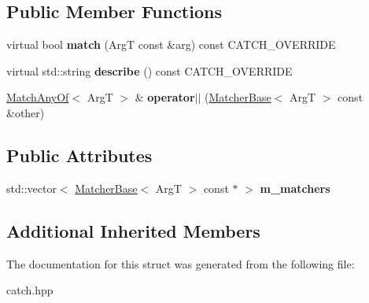\subsection*{Public Member Functions}
\begin{DoxyCompactItemize}
\item 
\mbox{\label{structCatch_1_1Matchers_1_1Impl_1_1MatchAnyOf_a73be317ecf5919af855af96d68e714b9}} 
virtual bool {\bfseries match} (ArgT const \&arg) const C\+A\+T\+C\+H\+\_\+\+O\+V\+E\+R\+R\+I\+DE
\item 
\mbox{\label{structCatch_1_1Matchers_1_1Impl_1_1MatchAnyOf_a020f5d7889d8cd8be9ad309c690147b6}} 
virtual std\+::string {\bfseries describe} () const C\+A\+T\+C\+H\+\_\+\+O\+V\+E\+R\+R\+I\+DE
\item 
\mbox{\label{structCatch_1_1Matchers_1_1Impl_1_1MatchAnyOf_a44d7582dbe09fc31b9a5ba8a6367b506}} 
\hyperlink{structCatch_1_1Matchers_1_1Impl_1_1MatchAnyOf}{Match\+Any\+Of}$<$ ArgT $>$ \& {\bfseries operator$\vert$$\vert$} (\hyperlink{structCatch_1_1Matchers_1_1Impl_1_1MatcherBase}{Matcher\+Base}$<$ ArgT $>$ const \&other)
\end{DoxyCompactItemize}
\subsection*{Public Attributes}
\begin{DoxyCompactItemize}
\item 
\mbox{\label{structCatch_1_1Matchers_1_1Impl_1_1MatchAnyOf_a1fb1119e6110dc15b8d5262ec0aeddd5}} 
std\+::vector$<$ \hyperlink{structCatch_1_1Matchers_1_1Impl_1_1MatcherBase}{Matcher\+Base}$<$ ArgT $>$ const  $\ast$ $>$ {\bfseries m\+\_\+matchers}
\end{DoxyCompactItemize}
\subsection*{Additional Inherited Members}


The documentation for this struct was generated from the following file\+:\begin{DoxyCompactItemize}
\item 
catch.\+hpp\end{DoxyCompactItemize}
